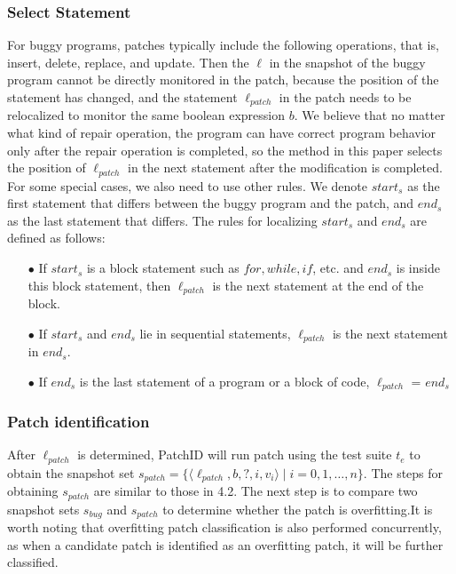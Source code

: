 \subsubsection{Select Statement}\label{4.4.1}

For buggy programs, patches typically include the following operations, that is, insert, delete, replace, and update. Then the $\ell$ in the snapshot of the buggy program cannot be directly monitored in the patch, because the position of the statement has changed, and the statement $\ell_{patch}$ in the patch needs to be relocalized to monitor the same boolean expression $b$. We believe that no matter what kind of repair operation, the program can have correct program behavior only after the repair operation is completed, so the method in this paper selects the position of $\ell_{patch}$ in the next statement after the modification is completed. For some special cases, we also need to use other rules.
We denote $start_s$ as the first statement that differs between the buggy program and the patch, and $end_s$ as the last statement that differs. The rules for localizing $start_s$ and $end_s$ are defined as follows:
\begin{itemize}
	\item[$\bullet$] If $start_s$ is a block statement such as $for, while, if$, etc. and $end_s$ is inside this block statement, then $\ell_{patch}$ is the next statement at the end of the  block.
	\item[$\bullet$] If $start_s$ and $end_s$ lie in sequential statements, $\ell_{patch}$ is the next statement in $end_s$.
	\item[$\bullet$] If $end_s$ is the last statement of a program or a block of code, $\ell_{patch}$ = $end_s$
\end{itemize}

\subsubsection{Patch identification}\label{4.4.2}
After $\ell_{patch}$ is determined, PatchID will run patch using the test suite $t_e$ to obtain the snapshot set $s_{patch}= \{ \langle \ell_{patch},b,?,i,v_i \rangle \mid i=0,1,\dots,n \}$. The steps for obtaining $s_{patch}$ are similar to those in 4.2. The next step is to compare two snapshot sets $s_{bug}$ and $s_{patch}$ to determine whether the patch is overfitting.It is worth noting that overfitting patch classification is also performed concurrently, as when a candidate patch is identified as an overfitting patch, it will be further classified.

